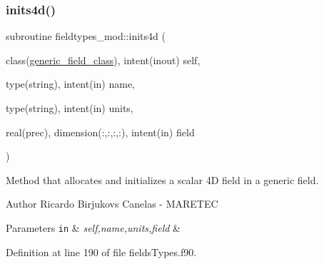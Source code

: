 \subsubsection{\texorpdfstring{inits4d()}{inits4d()}}
{\footnotesize\ttfamily subroutine fieldtypes\+\_\+mod\+::inits4d (\begin{DoxyParamCaption}\item[{class(\mbox{\hyperlink{structfieldtypes__mod_1_1generic__field__class}{generic\+\_\+field\+\_\+class}}), intent(inout)}]{self,  }\item[{type(string), intent(in)}]{name,  }\item[{type(string), intent(in)}]{units,  }\item[{real(prec), dimension(\+:,\+:,\+:,\+:), intent(in)}]{field }\end{DoxyParamCaption})\hspace{0.3cm}{\ttfamily [private]}}



Method that allocates and initializes a scalar 4D field in a generic field. 

\begin{DoxyAuthor}{Author}
Ricardo Birjukovs Canelas -\/ M\+A\+R\+E\+T\+EC 
\end{DoxyAuthor}

\begin{DoxyParams}[1]{Parameters}
\mbox{\tt in}  & {\em self,name,units,field} & \\
\hline
\end{DoxyParams}


Definition at line 190 of file fields\+Types.\+f90.


